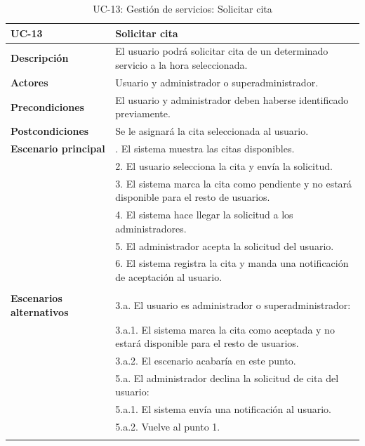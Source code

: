 \begin{table}
  \begin{center}
    \begin{tabularx}{16.4cm}{|l|X|}
      \hline
      \textbf{UC-13} & \textbf{Solicitar cita}\\
      \hline
      \textbf{Descripción} & El usuario podrá solicitar cita de un determinado servicio a la hora seleccionada.\\
      \hline
      \textbf{Actores} & Usuario y administrador o superadministrador.\\
      \hline
      \textbf{Precondiciones} & El usuario y administrador deben haberse identificado previamente.\\
      \hline
      \textbf{Postcondiciones} & Se le asignará la cita seleccionada al usuario.\\
      \hline
      \textbf{Escenario principal} & \smallskip 1. El sistema muestra las citas disponibles.\\
      & 2. El usuario selecciona la cita y envía la solicitud.\\
      & 3. El sistema marca la cita como pendiente y no estará disponible para el resto de usuarios. \\
      & 4. El sistema hace llegar la solicitud a los administradores.\\
      & 5. El administrador acepta la solicitud del usuario.\\
      & 6. El sistema registra la cita y manda una notificación de aceptación al usuario.\\
      & \\
      \hline
      \textbf{Escenarios alternativos} & \smallskip 3.a. El usuario es administrador o superadministrador:\\
      & \hspace{0.3cm} 3.a.1. El sistema marca la cita como aceptada y no estará disponible para el resto de usuarios. \\
      & \hspace{0.3cm} 3.a.2. El escenario acabaría en este punto.\\
      & \smallskip 5.a. El administrador declina la solicitud de cita del usuario:\\
      & \hspace{0.3cm} 5.a.1. El sistema envía una notificación al usuario.\\
      & \hspace{0.3cm} 5.a.2. Vuelve al punto 1.\\
      & \\
      \hline
    \end{tabularx}
    \caption{UC-13: Gestión de servicios: Solicitar cita}
    \label{tab:CU-solicitar-cita}
  \end{center}
\end{table}


